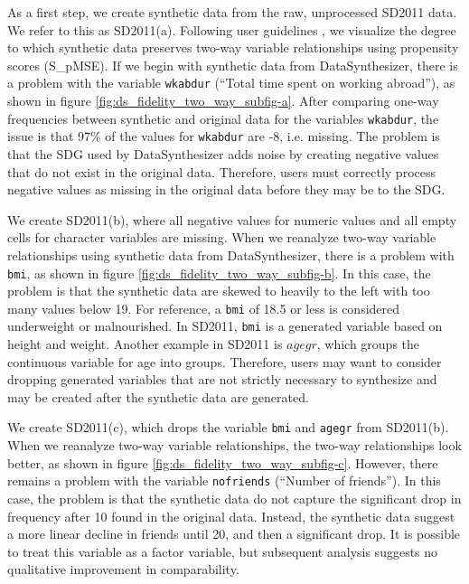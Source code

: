 \documentclass[runningheads]{llncs}
\begin{document}
As a first step, we create synthetic data from the raw, unprocessed SD2011 data.  We refer to this as SD2011(a).  Following user guidelines \cite{raab2021assessing}, we visualize the degree to which synthetic data preserves two-way variable relationships using propensity scores (S\_pMSE).  If we begin with synthetic data from DataSynthesizer, there is a problem with the variable \texttt{wkabdur} (``Total time spent on working abroad''), as shown in figure \ref{fig:ds_fidelity_two_way_subfig-a}.  After comparing one-way frequencies between synthetic and original data for the variables \texttt{wkabdur}, the issue is that 97\% of the values for \texttt{wkabdur} are -8, i.e. missing.  The problem is that the SDG used by DataSynthesizer adds noise by creating negative values that do not exist in the original data.  Therefore, users must correctly process negative values as missing in the original data before they may be to the SDG.  

We create SD2011(b), where all negative values for numeric values and all empty cells for character variables are missing.  When we reanalyze two-way variable relationships using synthetic data from DataSynthesizer, there is a problem with \texttt{bmi}, as shown in figure \ref{fig:ds_fidelity_two_way_subfig-b}.  In this case, the problem is that the synthetic data are skewed to heavily to the left with too many values below 19.  For reference, a \texttt{bmi} of 18.5 or less is considered underweight or malnourished.  In SD2011, \texttt{bmi} is a generated variable based on height and weight.  Another example in SD2011 is $agegr$, which groups the continuous variable for age into groups.  Therefore, users may want to consider dropping generated variables that are not strictly necessary to synthesize and may be created after the synthetic data are generated.  

We create SD2011(c), which drops the variable \texttt{bmi} and \texttt{agegr}  from SD2011(b).  When we reanalyze two-way variable relationships, the two-way relationships look better, as shown in figure \ref{fig:ds_fidelity_two_way_subfig-c}.  However, there remains a problem with the variable \texttt{nofriends} (``Number of friends'').  In this case, the problem is that the synthetic data do not capture the significant drop in frequency after 10 found in the original data.  Instead, the synthetic data suggest a more linear decline in friends until 20, and then a significant drop.  It is possible to treat this variable as a factor variable, but subsequent analysis suggests no qualitative improvement in comparability.
\end{document}
